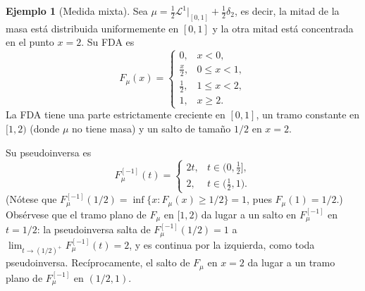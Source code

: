\documentclass[12pt, a4paper]{amsbook}
\theoremstyle{remark}
\theoremstyle{definition}
\newtheorem{ejem}[teo]{Ejemplo}
\numberwithin{section}{chapter}
\numberwithin{subsection}{section}
\numberwithin{equation}{section}
\numberwithin{figure}{chapter}
\begin{document}
\begin{ejem}[Medida mixta]\label{ejem:fda-mixta}
Sea $\mu=\frac{1}{2}\mathcal L^1|_{[0,1]}+\frac{1}{2}\delta_2$, es decir, la mitad
de la masa está distribuida uniformemente en $[0,1]$ y la otra mitad está concentrada
en el punto $x=2$. Su FDA es
\[
F_\mu(x)
=
\begin{cases}
0, & x<0,\\
\frac{x}{2}, & 0\le x<1,\\
\frac{1}{2}, & 1\le x<2,\\
1, & x\ge2.
\end{cases}
\]
La FDA tiene una parte estrictamente creciente en $[0,1]$, un tramo constante en
$[1,2)$ (donde $\mu$ no tiene masa) y un salto de tamaño $1/2$ en $x=2$.

Su pseudoinversa es
\[
F_\mu^{[-1]}(t)
=
\begin{cases}
2t, & t\in\bigl(0,\tfrac{1}{2}\bigr],\\
2, & t\in\bigl(\tfrac{1}{2},1\bigr).
\end{cases}
\]
(Nótese que $F_\mu^{[-1]}(1/2)=\inf\{x:F_\mu(x)\ge1/2\}=1$, pues
$F_\mu(1)=1/2$.) Obsérvese que el tramo plano de $F_\mu$ en $[1,2)$ da lugar
a un salto en $F_\mu^{[-1]}$ en $t=1/2$: la pseudoinversa salta de
$F_\mu^{[-1]}(1/2)=1$ a $\lim_{t\to(1/2)^+}F_\mu^{[-1]}(t)=2$, y es continua
por la izquierda, como toda pseudoinversa.
Recíprocamente, el salto de $F_\mu$ en $x=2$ da lugar a un tramo plano de
$F_\mu^{[-1]}$ en $(1/2,1)$.


\end{ejem}
\end{document}

